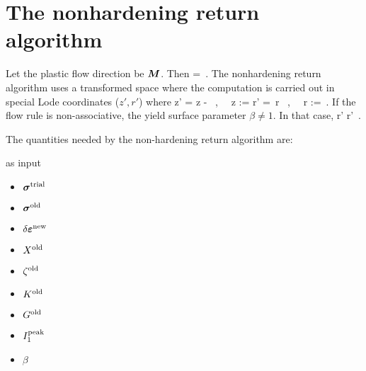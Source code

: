 \section{The nonhardening return algorithm}
\label{sec:nonhardening_return}
Let the plastic flow direction be $\boldsymbol{M}$.  Then
\Beq
   = \dot{\lambda}\BM \,.
\Eeq
The nonhardening return algorithm uses a transformed space where the computation is carried out
in special Lode coordinates ($z', r'$) where
\Beq
  z' = z -  ~,~~ z :=  \quad \Tand \quad
  r' = \,r ~,~~ r :=  \,.
\Eeq
If the flow rule is non-associative, the yield surface parameter $\beta \ne 1$.  In that case,
\Beq
  r' \leftarrow \beta r' \,.
\Eeq

The quantities needed by the non-hardening return algorithm are:
\begin{algorithmic}[1]
  \Require as input
    \begin{itemize} 
      \item $\boldsymbol{\sigma}^{\text{trial}}$  
      \item $\boldsymbol{\sigma}^{\text{old}}$  
      \item $\delta\boldsymbol{\varepsilon}^{\text{new}}$  
      \item $X^{\text{old}}$       
      \item $\zeta^{\text{old}}$       
      \item $K^{\text{old}}$       
      \item $G^{\text{old}}$       
      \item $I_1^{\text{peak}}$ 
      \item $\beta$ 
    \end{itemize}
\end{algorithmic}

